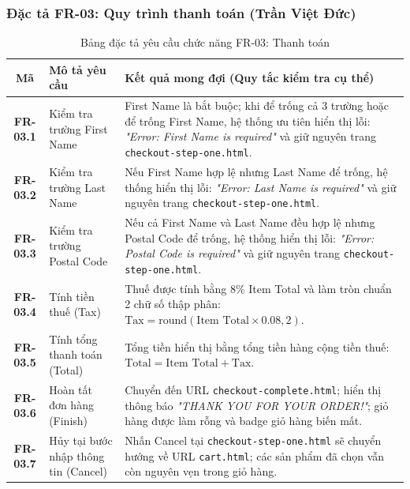 \documentclass[a4paper]{article}
\begin{document}
\subsubsection{Đặc tả FR-03: Quy trình thanh toán (Trần Việt Đức)}
\begin{table}[H]
\centering
\small
\begin{tabularx}{\textwidth}{|c|p{4.5cm}|X|}
\hline
\textbf{Mã} & \textbf{Mô tả yêu cầu} & \textbf{Kết quả mong đợi (Quy tắc kiểm tra cụ thể)} \\ \hline
\textbf{FR-03.1} & Kiểm tra trường First Name & First Name là bắt buộc; khi để trống cả 3 trường hoặc để trống First Name, hệ thống ưu tiên hiển thị lỗi: \textit{"Error: First Name is required"} và giữ nguyên trang \texttt{checkout-step-one.html}. \\ \hline
\textbf{FR-03.2} & Kiểm tra trường Last Name & Nếu First Name hợp lệ nhưng Last Name để trống, hệ thống hiển thị lỗi: \textit{"Error: Last Name is required"} và giữ nguyên trang \texttt{checkout-step-one.html}. \\ \hline
\textbf{FR-03.3} & Kiểm tra trường Postal Code & Nếu cả First Name và Last Name đều hợp lệ nhưng Postal Code để trống, hệ thống hiển thị lỗi: \textit{"Error: Postal Code is required"} và giữ nguyên trang \texttt{checkout-step-one.html}. \\ \hline
\textbf{FR-03.4} & Tính tiền thuế (Tax) & Thuế được tính bằng 8\% Item Total và làm tròn chuẩn 2 chữ số thập phân: $\text{Tax} = \text{round}(\text{Item Total} \times 0.08, 2)$. \\ \hline
\textbf{FR-03.5} & Tính tổng thanh toán (Total) & Tổng tiền hiển thị bằng tổng tiền hàng cộng tiền thuế: $\text{Total} = \text{Item Total} + \text{Tax}$. \\ \hline
\textbf{FR-03.6} & Hoàn tất đơn hàng (Finish) & Chuyển đến URL \texttt{checkout-complete.html}; hiển thị thông báo \textit{"THANK YOU FOR YOUR ORDER!"}; giỏ hàng được làm rỗng và badge giỏ hàng biến mất. \\ \hline
\textbf{FR-03.7} & Hủy tại bước nhập thông tin (Cancel) & Nhấn Cancel tại \texttt{checkout-step-one.html} sẽ chuyển hướng về URL \texttt{cart.html}; các sản phẩm đã chọn vẫn còn nguyên vẹn trong giỏ hàng. \\ \hline
\end{tabularx}
\caption{Bảng đặc tả yêu cầu chức năng FR-03: Thanh toán}
\end{table}
\end{document}
